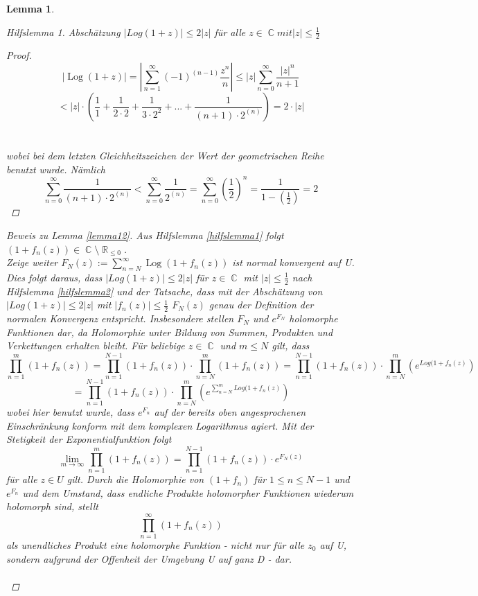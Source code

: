 \documentclass[10pt,a4paper]{article}
\theoremstyle{plain}
\newtheorem{lem}[thm]{Lemma}
\theoremstyle{definition}
\theoremstyle{remark}
\newtheorem{hilfslem}{Hilfslemma}
\DeclareMathOperator{\R}{\mathbb{R}}
\DeclareMathOperator{\C}{\mathbb{C}}
\DeclareMathOperator{\Log}{Log}
\begin{document}
\begin{lem}
\begin{hilfslem}
Abschätzung $ |Log(1+z)|\leq 2|z|$ für alle $z \in \C mit |z| \leq \frac{1}{2}$

\begin{proof}

$$|\Log(1+z)|= |\sum_{n = 1}^\infty (-1)^{(n-1)}\frac{z^{n}}{n}|\leq|z|\sum_{n = 0}^\infty\frac{|z|^{n}}{n + 1}$$
$$< |z|\cdot (\frac{1}{1}+\frac{1}{2\cdot 2}+\frac{1}{3 \cdot2^2}+...+\frac{1}{(n+1)\cdot2^(n)}) = 2\cdot|z| $$
\\
\\
wobei bei dem letzten Gleichheitszeichen der Wert der geometrischen Reihe benutzt wurde. Nämlich $$\sum_{n=0}^{\infty}\frac{1}{(n+1)\cdot2^{(n)}} < \sum_{n=0}^{\infty}\frac{1}{2^{(n)}} = \sum_{n=0}^{\infty}(\frac{1}{2})^n = \frac{1}{1-(\frac{1}{2})} = 2 $$

\end{proof}
\end{hilfslem}

\begin{proof}[Beweis zu Lemma \ref{lemma12}]
\noindent Aus Hilfslemma \ref{hilfslemma1} folgt $(1 + f_{n}(z)) \in \C \setminus \R_{\leq 0 }$. \\
 Zeige weiter $F_{N}(z) := \sum_{n = N}^\infty \Log( 1 + f_{n}(z))$ ist normal konvergent auf U. Dies folgt daraus, dass $| Log( 1 + z) | \leq 2|z| $ für $z \in \C$ mit $|z| \leq \frac{1}{2}$ nach Hilfslemma \ref{hilfslemma2}  und der Tatsache, dass mit der Abschätzung von $|Log(1+z)| \leq 2|z|$ mit $|f_n(z)|\leq \frac{1}{2}$ $F_{N}(z)$ genau der Definition der normalen Konvergenz entspricht.
Insbesondere stellen $F_{N}$ und $e^{F_{N}}$ holomorphe Funktionen dar, da Holomorphie unter Bildung von Summen, Produkten und Verkettungen erhalten bleibt. Für beliebige $z \in \C $ und $m\leq N$ gilt, dass 
$$\prod_{n = 1 }^{m}( 1 + f_{n}(z)) = \prod_{n = 1}^{N - 1}( 1 + f_{n}(z)) \cdot \prod_{n = N}^{m}( 1 + f_{n}(z))= \prod_{n = 1}^{N - 1}( 1 + f_{n}(z)) \cdot \prod_{n = N}^{m}(e^{Log( 1 + f_{n}(z)}) $$ $$= \prod_{n = 1}^{N - 1}( 1 + f_{n}(z)) \cdot \prod_{n = N}^{m}(e^{\sum_{n = N}^{m}Log( 1 + f_{n}(z)})$$
wobei hier benutzt wurde, dass $e^{F_{n}}$ auf der bereits oben angesprochenen Einschränkung konform mit dem komplexen Logarithmus agiert. Mit der Stetigkeit der Exponentialfunktion folgt $$\lim_{m\rightarrow\infty}\prod_{n=1}^m ( 1 + f_{n}(z)) =\prod_{n = 1}^{N - 1}(1 + f_{n}(z))\cdot e^{F_{N}(z)}$$ für alle $z \in U$ gilt. Durch die Holomorphie von $(1+ f_{n})$ für $1 \leq n \leq N - 1$ und $e^{F_{n}}$ und dem Umstand, dass endliche Produkte holomorpher Funktionen wiederum holomorph sind, stellt $$\prod_{n =1}^{\infty}(1 +f_n (z))$$ als unendliches Produkt eine holomorphe Funktion - nicht nur für alle $z_0$ auf U, sondern aufgrund der Offenheit der Umgebung U auf ganz D - dar.
\\
\\
\end{proof}
\end{lem}
\end{document}
